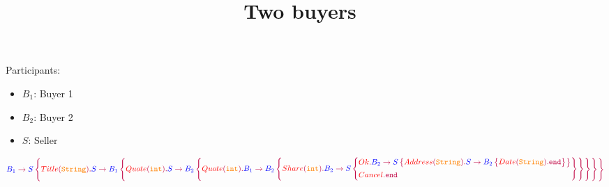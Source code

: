 \documentclass{article}
\title{Two buyers~\cite{HondaMultiparty2016}}
\date{}
\begin{document}
	\maketitle

	Participants:
	\begin{itemize}
		\item $B_1$: Buyer 1
		\item $B_2$: Buyer 2
		\item $S$: Seller
	\end{itemize}

	$$
	\gtComm{B_1}{S}{
		{{Title}[String]{
				\gtComm{S}{B_1}{
					{{Quote}[int]{
							\gtComm{S}{B_2}{
								{{Quote}[int]{
										\gtComm{B_1}{B_2}{
											{{Share}[int]{
													\gtComm{B_2}{S}{
														{{Ok}{
																\gtComm{B_2}{S}{
																	{{Address}[String]{
																			\gtComm{S}{B_2}{{{Date}[String]{\gtEnd}}}
																	}}
																}
														}}
														{{Cancel}{\gtEnd}}
													}
											}}
										}
								}}
							}
					}}
				}
		}}
	}
	$$

	
	
\end{document}
